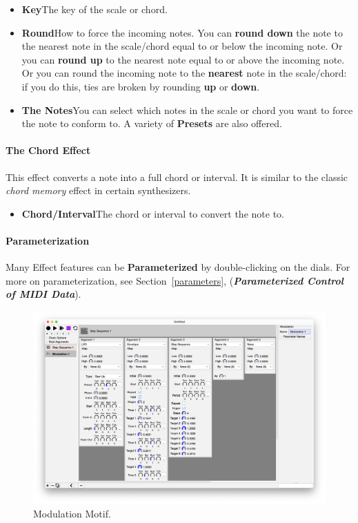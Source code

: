 \documentclass[twoside,10pt]{article}
\begin{document}
\begin{itemize}
\item {\bf Key}\qquad The key of the scale or chord.
\item {\bf Round}\qquad How to force the incoming notes. You can {\bf round down} the note to the nearest note in the scale/chord equal to or below the incoming note.  Or you can {\bf round up} to the nearest note equal to or above the incoming note.  Or you can round the incoming note to the {\bf nearest} note in the scale/chord: if you do this, ties are broken by rounding {\bf up} or {\bf down}.
\item {\bf The Notes}\qquad You can select which notes in the scale or chord you want to force the note to conform to.  A variety of {\bf Presets} are also offered.
\end{itemize}

\paragraph{The Chord Effect}

This effect converts a note into a full chord or interval.  It is similar to the classic {\it chord memory} effect in certain synthesizers.

\begin{itemize}
\item {\bf Chord/Interval}\qquad The chord or interval to convert the note to.
\end{itemize}



\paragraph{Parameterization}

Many Effect features can be {\bf Parameterized} by double-clicking on the dials.  For more on parameterization, see Section~\ref{parameters}, (\textbf{\textit{Parameterized Control of MIDI Data}}).



\clearpage

\begin{figure}[t]
\centering
\includegraphics[width=6.5in]{Modulation}
\vspace{-2em}
\caption{Modulation Motif.}
\label{filter}
\end{figure}
\end{document}

